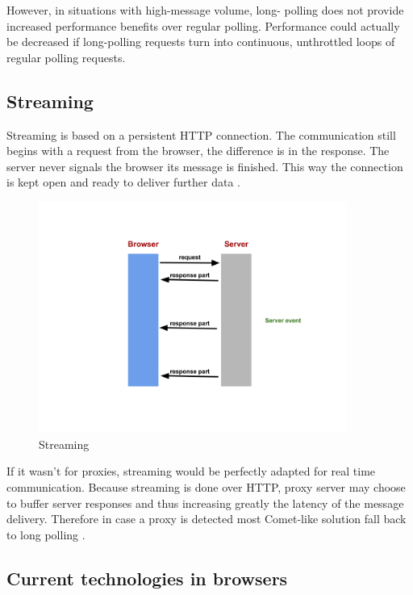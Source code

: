 However, in situations with high-message volume, long- polling does not provide
increased performance benefits over regular polling. Performance could actually
be decreased if long-polling requests turn into continuous, unthrottled loops
of regular polling requests.


\subsection{Streaming}

Streaming is based on a persistent HTTP connection. The communication still
begins with a request from the browser, the difference is in the response. The
server never signals the browser its message is finished. This way the
connection is kept open and ready to deliver further data \citep{Reference2}.

\begin{figure}[H]
\centering
\includegraphics[width=0.9\textwidth]{./Figures/streaming.png}
\caption[Streaming]{Streaming}
\label{fig:streaming}
\end{figure}

If it wasn't for proxies, streaming would be perfectly adapted for real time
communication. Because streaming is done over HTTP, proxy server may choose to
buffer server responses and thus increasing greatly the latency of the message
delivery. Therefore in case a proxy is detected most Comet-like solution fall
back to long polling \citep{Reference2}.

\subsection{Current technologies in browsers}

